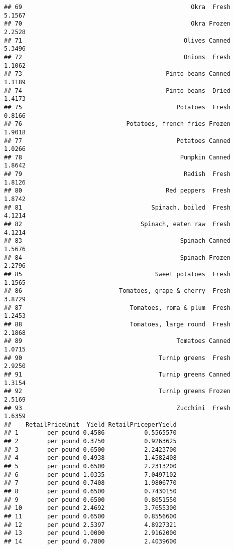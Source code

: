 \documentclass[
]{article}
\begin{document}
\begin{verbatim}
## 69                                               Okra  Fresh      5.1567
## 70                                               Okra Frozen      2.2528
## 71                                             Olives Canned      5.3496
## 72                                             Onions  Fresh      1.1062
## 73                                        Pinto beans Canned      1.1189
## 74                                        Pinto beans  Dried      1.4173
## 75                                           Potatoes  Fresh      0.8166
## 76                             Potatoes, french fries Frozen      1.9018
## 77                                           Potatoes Canned      1.0266
## 78                                            Pumpkin Canned      1.8642
## 79                                             Radish  Fresh      1.8126
## 80                                        Red peppers  Fresh      1.8742
## 81                                    Spinach, boiled  Fresh      4.1214
## 82                                 Spinach, eaten raw  Fresh      4.1214
## 83                                            Spinach Canned      1.5676
## 84                                            Spinach Frozen      2.2796
## 85                                     Sweet potatoes  Fresh      1.1565
## 86                           Tomatoes, grape & cherry  Fresh      3.8729
## 87                              Tomatoes, roma & plum  Fresh      1.2453
## 88                              Tomatoes, large round  Fresh      2.1868
## 89                                           Tomatoes Canned      1.0715
## 90                                      Turnip greens  Fresh      2.9250
## 91                                      Turnip greens Canned      1.3154
## 92                                      Turnip greens Frozen      2.5169
## 93                                           Zucchini  Fresh      1.6359
##    RetailPriceUnit  Yield RetailPriceperYield
## 1        per pound 0.4586           0.5565570
## 2        per pound 0.3750           0.9263625
## 3        per pound 0.6500           2.2423700
## 4        per pound 0.4938           1.4582408
## 5        per pound 0.6500           2.2313200
## 6        per pound 1.0335           7.0497102
## 7        per pound 0.7408           1.9806770
## 8        per pound 0.6500           0.7430150
## 9        per pound 0.6500           0.8051550
## 10       per pound 2.4692           3.7655300
## 11       per pound 0.6500           0.8556600
## 12       per pound 2.5397           4.8927321
## 13       per pound 1.0000           2.9162000
## 14       per pound 0.7800           2.4039600

\end{verbatim}
\end{document}
